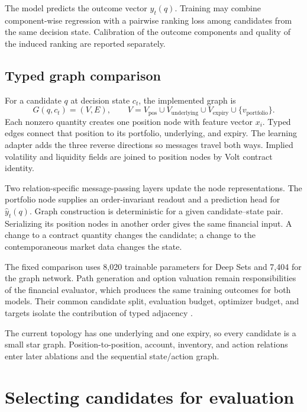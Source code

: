 \documentclass{strategynet-journal}
\begin{document}
The model predicts the outcome vector \(y_t(q)\).  Training may combine
component-wise regression with a pairwise ranking loss among candidates from
the same decision state.  Calibration of the outcome components and quality of
the induced ranking are reported separately.

\subsection{Typed graph comparison}

For a candidate \(q\) at decision state \(c_t\), the implemented graph is
\[
  G(q,c_t)=(V,E),\qquad
  V=V_{\mathrm{pos}}\cup V_{\mathrm{underlying}}
    \cup V_{\mathrm{expiry}}\cup\{v_{\mathrm{portfolio}}\}.
\]
Each nonzero quantity creates one position node with feature vector \(x_i\).
Typed edges connect that position to its portfolio, underlying, and expiry.
The learning adapter adds the three reverse directions so messages travel
both ways.  Implied volatility and liquidity fields are joined to position
nodes by Volt contract identity.

Two relation-specific message-passing layers update the node representations.
The portfolio node supplies an order-invariant readout and a prediction head
for \(\widehat y_t(q)\).  Graph construction is deterministic for a given
candidate--state pair.  Serializing its position nodes in another order gives
the same financial input.  A change to a contract quantity changes the
candidate; a change to the contemporaneous market data changes the state.

The fixed comparison uses 8,020 trainable parameters for Deep Sets and 7,404
for the graph network.  Path generation and option valuation remain
responsibilities of the financial evaluator, which produces the same training
outcomes for both models.  Their common candidate split, evaluation budget,
optimizer budget, and targets isolate the contribution of typed adjacency
\cite{relational}.

The current topology has one underlying and one expiry, so every candidate is
a small star graph.  Position-to-position, account, inventory, and action
relations enter later ablations and the sequential state/action graph.

\section{Selecting candidates for evaluation}
\label{sec:acquisition}
\end{document}
